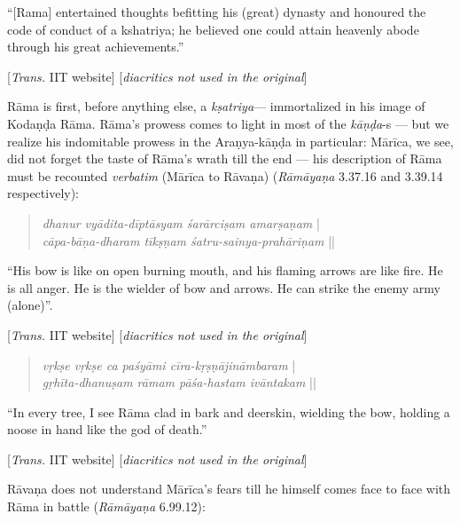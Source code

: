 \begin{myquote}
“[Rama] entertained thoughts befitting his (great) dynasty and honoured the code of conduct of a kshatriya; he believed one could attain heavenly abode through his great achievements.”

\hfill [{\sl Trans.} IIT website] [{\sl diacritics not used in the original}]
\end{myquote}

Rāma is first, before anything else, a {\sl kṣatriya}--- immortalized in his image of Kodaṇḍa Rāma. Rāma’s prowess comes to light in most of the {\sl kāṇḍa}-s --- but we realize his indomitable prowess in the Araṇya-kāṇḍa in particular: Mārīca, we see, did not forget the taste of Rāma’s wrath till the end --- his description of Rāma must be recounted {\sl verbatim} (Mārīca to Rāvaṇa) ({\sl Rāmāyaṇa} 3.37.16 and 3.39.14 respectively): 
\begin{quote}
{{\sl dhanur vyādita-dīptāsyam śarārciṣam amarṣaṇam}}\label{verse40} |\\
{\sl cāpa-bāṇa-dharam tīkṣṇam śatru-sainya-prahāriṇam} ||
\end{quote}

\begin{myquote}
“His bow is like on open burning mouth, and his flaming arrows are like fire. He is all anger. He is the wielder of bow and arrows. He can strike the enemy army (alone)”.

\hfill [{\sl Trans.} IIT website] [{\sl diacritics not used in the original}] 
\end{myquote}

\begin{quote}
{{\sl vṛkṣe vṛkṣe ca paśyāmi cīra-kṛṣṇājināmbaram}}\label{verse41} |\\
{\sl gṛhīta-dhanuṣam rāmam pāśa-hastam ivāntakam} || 
\end{quote}

\begin{myquote}
“In every tree, I see Rāma clad in bark and deerskin, wielding the bow, holding a noose in hand like the god of death.” 

\hfill [{\sl Trans.} IIT website] [{\sl diacritics not used in the original}]
\end{myquote}

Rāvaṇa does not understand Mārīca’s fears till he himself comes face to face with Rāma in battle ({\sl Rāmāyaṇa} 6.99.12): 

